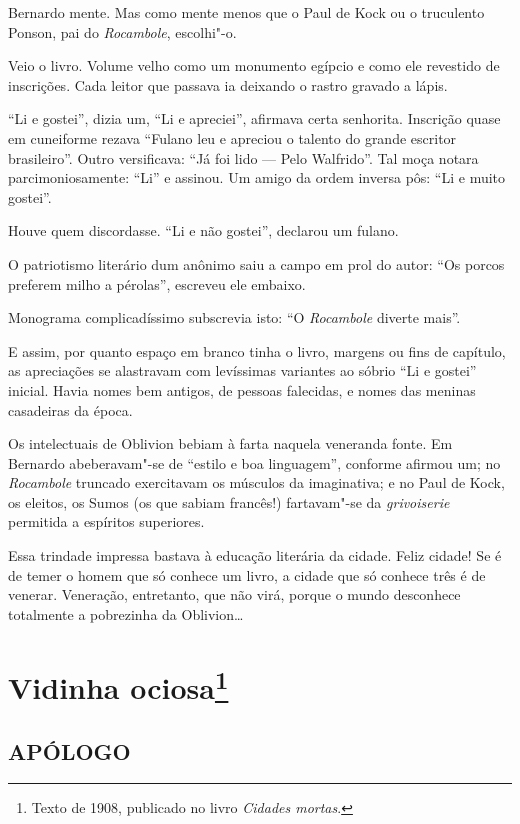 Bernardo mente. Mas como mente menos que o Paul de Kock ou o truculento
Ponson, pai do \emph{Rocambole}, escolhi"-o.

Veio o livro. Volume velho como um monumento egípcio e como ele
revestido de inscrições. Cada leitor que passava ia deixando o rastro
gravado a lápis.

``Li e gostei'', dizia um, ``Li e apreciei'', afirmava certa senhorita.
Inscrição quase em cuneiforme rezava ``Fulano leu e apreciou o talento
do grande escritor brasileiro''. Outro versificava: ``Já foi lido ---
Pelo Walfrido''. Tal moça notara parcimoniosamente: ``Li'' e assinou. Um
amigo da ordem inversa pôs: ``Li e muito gostei''.

Houve quem discordasse. ``Li e não gostei'', declarou um fulano.

O patriotismo literário dum anônimo saiu a campo em prol do autor: ``Os
porcos preferem milho a pérolas'', escreveu ele embaixo.

Monograma complicadíssimo subscrevia isto: ``O \emph{Rocambole} diverte
mais''.

E assim, por quanto espaço em branco tinha o livro, margens ou fins de
capítulo, as apreciações se alastravam com levíssimas variantes ao
sóbrio ``Li e gostei'' inicial. Havia nomes bem antigos, de pessoas
falecidas, e nomes das meninas casadeiras da época.

Os intelectuais de Oblivion bebiam à farta naquela veneranda fonte. Em
Bernardo abeberavam"-se de ``estilo e boa linguagem'', conforme afirmou
um; no \emph{Rocambole} truncado exercitavam os músculos da imaginativa;
e no Paul de Kock, os eleitos, os Sumos (os que sabiam francês!)
fartavam"-se da \emph{grivoiserie} permitida a espíritos superiores.

Essa trindade impressa bastava à educação literária da cidade. Feliz
cidade! Se é de temer o homem que só conhece um livro, a cidade que só
conhece três é de venerar. Veneração, entretanto, que não virá, porque o
mundo desconhece totalmente a pobrezinha da Oblivion\ldots{}

\chapter{Vidinha ociosa\footnote[*]{Texto de 1908, publicado no livro \emph{Cidades mortas}.}}

\section*{APÓLOGO}

